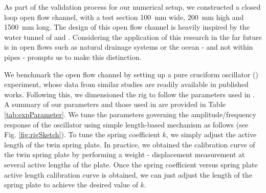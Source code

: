 \documentclass[a4paper,fleqn]{cas-sc}
\begin{document}
As part of the validation process for our numerical setup, we constructed a closed loop open flow channel, with a test section \SI{100}{\milli\metre} wide, \SI{200}{\milli\metre} high and \SI{1500}{\milli\metre} long. The design of this open flow channel is heavily inspired by the water tunnel of \citet{Nguyen2012} and \citet{Koide2013}. Considering the application of this research in the far future is in open flows such as natural drainage systems or the ocean - and not within pipes - prompts us to make this distinction.

We benchmark the open flow channel by setting up a pure cruciform oscillator (\angfi{}) experiment, whose data from similar studies are readily available in published works. Following this, we dimensioned the rig to follow the parameters used in \citet{Koide2013}. A summary of our parameters and those used in \citet{Koide2013} are provided in Table \ref{tab:expParameter}. We tune the parameters governing the amplitude/frequency response of the oscillator using simple length-based mechanism as follows (see Fig. \ref{fig:rigSketch}). To tune the spring coefficient $k$, we simply adjust the active length of the twin spring plate. In practice, we obtained the calibration curve of the twin spring plate by performing a weight - displacement measurement \citep{Sun2016} at several active lengths of the plate. Once the spring coefficient versus spring plate active length calibration curve is obtained, we can just adjust the length of the spring plate to achieve the desired value of $k$.
\end{document}

